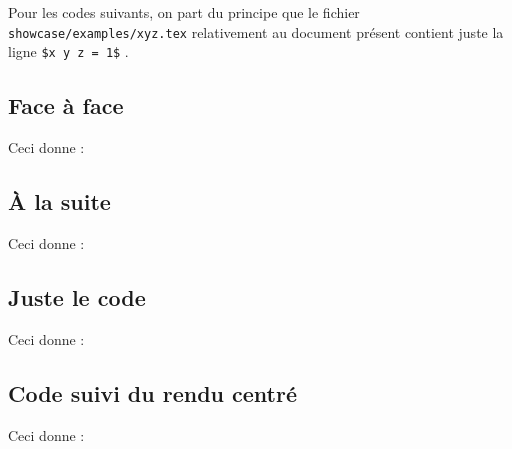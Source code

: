Pour les codes suivants, on part du principe que le fichier \verb+showcase/examples/xyz.tex+ relativement au document présent contient juste la ligne \verb+$x y z = 1$+ .

\subsection{Face à face}

\begin{doclatex-alone}
\end{doclatex-alone}

Ceci donne :





\subsection{À la suite}

\begin{doclatex-alone}
\end{doclatex-alone}

Ceci donne :





\subsection{Juste le code}

\begin{doclatex-alone}
\end{doclatex-alone}

Ceci donne :





\subsection{Code suivi du rendu centré}

\begin{doclatex-alone}
\end{doclatex-alone}

Ceci donne :

